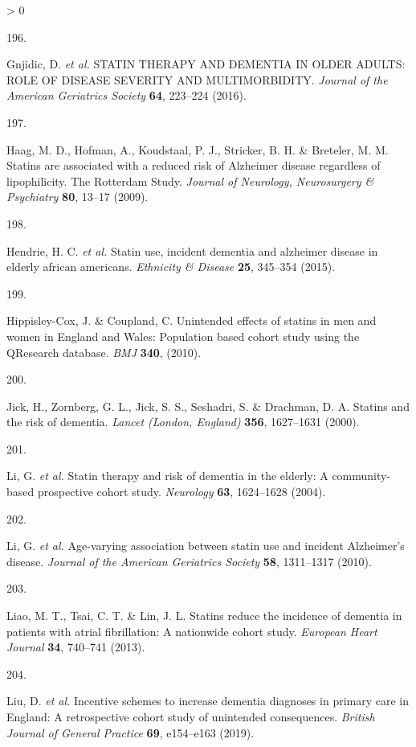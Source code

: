 \documentclass[a4paper, twoside]{templates/ociamthesis}
\newlength{\cslhangindent}
\newlength{\csllabelwidth}
\newenvironment{CSLReferences}[3] %
 {%
  \setlength{\parindent}{0pt}
  \ifodd #1 \everypar{\setlength{\hangindent}{\cslhangindent}}\ignorespaces\fi
  \ifnum #2 > 0
  \setlength{\parskip}{#2\baselineskip}
  \fi
 }%
 {}
\newcommand{\CSLLeftMargin}[1]{\parbox[t]{\maxof{\widthof{#1}}{\csllabelwidth}}{#1}}
\newcommand{\CSLRightInline}[1]{\parbox[t]{\linewidth - \csllabelwidth}{#1}}
\begin{document}
\begin{CSLReferences}{0}{0}
\leavevmode\hypertarget{ref-gnjidic2016}{}%
\CSLLeftMargin{196. }
\CSLRightInline{Gnjidic, D. \emph{et al.} {STATIN THERAPY AND DEMENTIA IN OLDER ADULTS}: {ROLE OF DISEASE SEVERITY AND MULTIMORBIDITY}. \emph{Journal of the American Geriatrics Society} \textbf{64}, 223--224 (2016).}

\leavevmode\hypertarget{ref-haag2009}{}%
\CSLLeftMargin{197. }
\CSLRightInline{Haag, M. D., Hofman, A., Koudstaal, P. J., Stricker, B. H. \& Breteler, M. M. Statins are associated with a reduced risk of {Alzheimer} disease regardless of lipophilicity. {The Rotterdam Study}. \emph{Journal of Neurology, Neurosurgery \& Psychiatry} \textbf{80}, 13--17 (2009).}

\leavevmode\hypertarget{ref-hendrie2015}{}%
\CSLLeftMargin{198. }
\CSLRightInline{Hendrie, H. C. \emph{et al.} Statin use, incident dementia and alzheimer disease in elderly african americans. \emph{Ethnicity \& Disease} \textbf{25}, 345--354 (2015).}

\leavevmode\hypertarget{ref-hippisley-cox2010}{}%
\CSLLeftMargin{199. }
\CSLRightInline{Hippisley-Cox, J. \& Coupland, C. Unintended effects of statins in men and women in {England} and {Wales}: Population based cohort study using the {QResearch} database. \emph{BMJ} \textbf{340}, (2010).}

\leavevmode\hypertarget{ref-jick2000}{}%
\CSLLeftMargin{200. }
\CSLRightInline{Jick, H., Zornberg, G. L., Jick, S. S., Seshadri, S. \& Drachman, D. A. Statins and the risk of dementia. \emph{Lancet (London, England)} \textbf{356}, 1627--1631 (2000).}

\leavevmode\hypertarget{ref-li2004}{}%
\CSLLeftMargin{201. }
\CSLRightInline{Li, G. \emph{et al.} Statin therapy and risk of dementia in the elderly: A community-based prospective cohort study. \emph{Neurology} \textbf{63}, 1624--1628 (2004).}

\leavevmode\hypertarget{ref-li2010}{}%
\CSLLeftMargin{202. }
\CSLRightInline{Li, G. \emph{et al.} Age-varying association between statin use and incident {Alzheimer}'s disease. \emph{Journal of the American Geriatrics Society} \textbf{58}, 1311--1317 (2010).}

\leavevmode\hypertarget{ref-liao2013}{}%
\CSLLeftMargin{203. }
\CSLRightInline{Liao, M. T., Tsai, C. T. \& Lin, J. L. Statins reduce the incidence of dementia in patients with atrial fibrillation: A nationwide cohort study. \emph{European Heart Journal} \textbf{34}, 740--741 (2013).}

\leavevmode\hypertarget{ref-liu2019}{}%
\CSLLeftMargin{204. }
\CSLRightInline{Liu, D. \emph{et al.} Incentive schemes to increase dementia diagnoses in primary care in {England}: A retrospective cohort study of unintended consequences. \emph{British Journal of General Practice} \textbf{69}, e154--e163 (2019).}


\end{CSLReferences}
\end{document}
